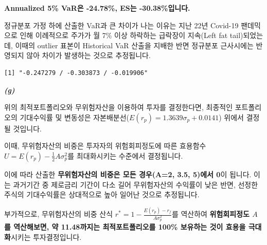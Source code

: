 \documentclass[
  a4paper,
  DIV=11,
  numbers=noendperiod]{scrreprt}
\newenvironment{Shaded}{\begin{snugshade}}{\end{snugshade}}
\newcommand{\AttributeTok}[1]{\textcolor[rgb]{0.40,0.45,0.13}{#1}}
\newcommand{\DecValTok}[1]{\textcolor[rgb]{0.68,0.00,0.00}{#1}}
\newcommand{\FunctionTok}[1]{\textcolor[rgb]{0.28,0.35,0.67}{#1}}
\newcommand{\NormalTok}[1]{\textcolor[rgb]{0.00,0.23,0.31}{#1}}
\newcommand{\OtherTok}[1]{\textcolor[rgb]{0.00,0.23,0.31}{#1}}
\newcommand{\SpecialCharTok}[1]{\textcolor[rgb]{0.37,0.37,0.37}{#1}}
\newcommand{\StringTok}[1]{\textcolor[rgb]{0.13,0.47,0.30}{#1}}
\begin{document}
\textbf{Annualized 5\% VaR은 -24.78\%, ES는 -30.38\%입니다.}

정규분포 가정 하에 산출한 VaR과 큰 차이가 나는 이유는 지난 22년 Covid-19
팬데믹으로 인해 이례적으로 주가가 월 7\% 이상 하락하는 급락장이
지속(Left fat tail)되었는데, 이때의 outlier 표본이 Historical VaR 산출을
지배한 반면 정규분포 근사시에는 반영되지 않아 차이가 발생하는 것으로
추정됩니다.

\begin{Shaded}
\end{Shaded}

\begin{verbatim}
[1] "-0.247279 / -0.303873 / -0.019906"
\end{verbatim}

\textbf{\emph{(g)}}

위의 최적포트폴리오와 무위험자산을 이용하여 투자를 결정한다면, 최종적인
포트폴리오의 기대수익률 및 변동성은
자본배분선(\(E(r_p)=1.3639\sigma_p+0.0141\)) 위에서 결정될 것입니다.

이때, 무위험자산의 비중은 투자자의 위험회피정도에 따른 효용함수
\(U=E(r_p)-\frac{1}{2}A\sigma_p^2\)를 최대화시키는 수준에서 결정됩니다.

이에 따라 산출한 \textbf{무위험자산의 비중은 모든 경우(A=2, 3.5, 5)에서
0}이 됩니다. 이는 과거기간 중 제로금리 기간이 다소 길어 무위험자산의
수익률이 낮은 반면, 선정한 주식의 기대수익률은 상대적으로 높아 일어난
것으로 추정됩니다.

부가적으로, 무위험자산의 비중 산식
\(r^*=1-\frac{E(r_p)-r_f}{A\sigma_p^2}\)를 역산하여 \textbf{위험회피정도
\(A\)를 역산해보면, 약 11.48까지는 최적포트폴리오를 100\% 보유하는 것이
효용을 극대화}시키는 투자결정입니다.
\end{document}
